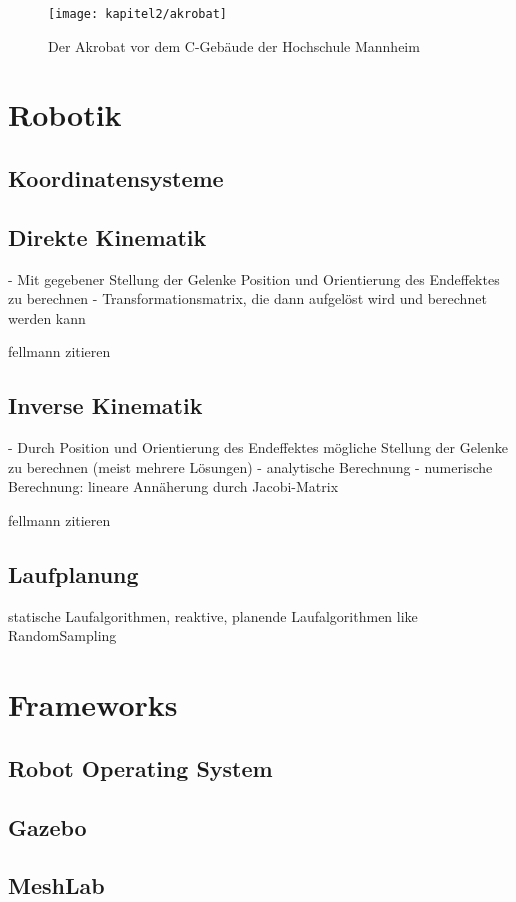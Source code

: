\begin{figure}[t]
  \centering
  \texttt{[image: kapitel2/akrobat]}
  \caption{Der Akrobat vor dem C-Gebäude der Hochschule Mannheim}
  \label{Kap2:akrobat}
\end{figure}



\section{Robotik}

\subsection{Koordinatensysteme}
\subsection{Direkte Kinematik}

- Mit gegebener Stellung der Gelenke Position und Orientierung des Endeffektes zu berechnen
- Transformationsmatrix, die dann aufgelöst wird und berechnet werden kann

fellmann zitieren

\autocite{fellmann2007}

\subsection{Inverse Kinematik}

- Durch Position und Orientierung des Endeffektes mögliche Stellung der Gelenke zu berechnen (meist mehrere Lösungen)
- analytische Berechnung
- numerische Berechnung: lineare Annäherung durch Jacobi-Matrix

fellmann zitieren

\autocite{fellmann2007}

\subsection{Laufplanung}

statische Laufalgorithmen, reaktive, planende Laufalgorithmen like RandomSampling

\section{Frameworks}

\subsection{Robot Operating System}
\subsection{Gazebo}
\subsection{MeshLab}